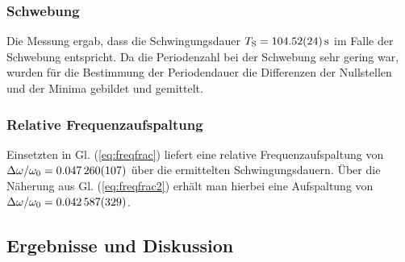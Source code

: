 \documentclass[11pt,a4paper,titlepage, ngerman]{article}
\newcommand{\refeq}[1]{Gl. (\ref{eq:#1})}
\begin{document}
			\subsubsection{Schwebung}
			
				Die Messung ergab, dass die Schwingungsdauer $T_\text{S} = \SI{104,52 +- 0,24}{\second}$ im Falle der Schwebung entspricht.  Da die Periodenzahl bei der Schwebung sehr gering war, wurden für die Bestimmung der Periodendauer die Differenzen der Nullstellen und der Minima gebildet und gemittelt.
			
			\subsubsection{Relative Frequenzaufspaltung}
			
				Einsetzten in \refeq{freqfrac} liefert eine relative Frequenzaufspaltung von $\Delta\omega / \omega_0 = \SI{0,047260 +- 0,000107}{}$ über die ermittelten Schwingungsdauern. Über die Näherung aus \refeq{freqfrac2} erhält man hierbei eine Aufspaltung von $\Delta\omega / \omega_0 = \SI{0,042587 +- 0,000329}{}$.
																
		\subsection{Ergebnisse und Diskussion}	
			
\end{document}
